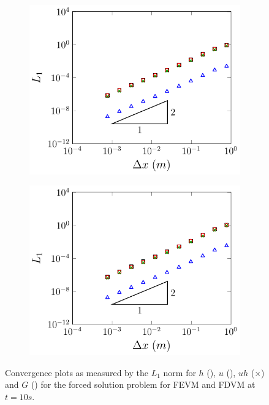 \begin{figure}
	\centering
	\begin{subfigure}{0.5\textwidth}
		\includegraphics[width=\textwidth]{./chp5/figures/Forced/Wet/FEVML1.pdf}
		\vspace{0.5cm}
	\end{subfigure}%
	\begin{subfigure}{0.5\textwidth}
		\includegraphics[width=\textwidth]{./chp5/figures/Forced/Wet/FDVML1.pdf}
		\vspace{0.5cm}
	\end{subfigure}
	\caption{Convergence plots as measured by the $L_1$ norm for $h$ (), $u$ (),  $uh$ ({\color{green!60!black}$\times$})  and $G$ () for the forced solution problem for FEVM and FDVM at $t=10s$.}
	\label{fig:L1convergenceforcedWet}
\end{figure}


